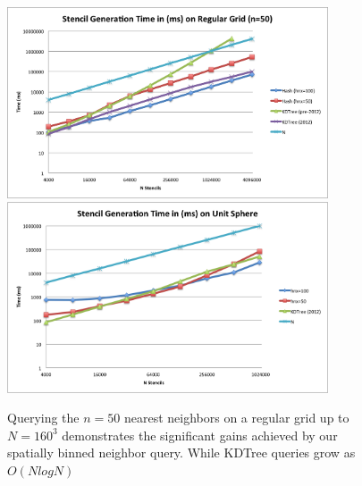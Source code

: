 \documentclass[11pt]{report}
\begin{document}
\begin{figure}
\centering
\includegraphics[width=9.5cm]{../figures/stencils/kdtree_old_reg_subsets_4m_stencil_gen_time.png}
\includegraphics[width=9.5cm]{../figures/stencils/sphere_subsets_1m_stencil_gen_time.png}
\caption{Querying the $n=50$ nearest neighbors on a regular grid up to $N=160^3$ demonstrates the significant gains achieved by our spatially binned neighbor query. While KDTree queries grow as $O(N log N)$}
\label{fig:hash_results}
\end{figure}
\end{document}
